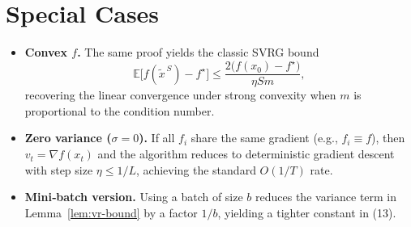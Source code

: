 \documentclass{article}
\newcommand{\EE}{\mathbb{E}}
\newcommand{\grad}{\nabla}
\begin{document}
\section*{Special Cases}
\begin{itemize}
\item \textbf{Convex $f$.} The same proof yields the classic SVRG bound
\[
\EE\!\bigl[f(\tilde{x}^{\,S})-f^\star\bigr]\le \frac{2\bigl(f(x_0)-f^\star\bigr)}{\eta S m},
\]
recovering the linear convergence under strong convexity when $m$ is proportional to the condition number.
\item \textbf{Zero variance ($\sigma=0$).} If all $f_i$ share the same gradient (e.g., $f_i\equiv f$), then $v_t=\grad f(x_t)$ and the algorithm reduces to deterministic gradient descent with step size $\eta\le 1/L$, achieving the standard $O(1/T)$ rate.
\item \textbf{Mini‑batch version.} Using a batch of size $b$ reduces the variance term in Lemma~\ref{lem:vr-bound} by a factor $1/b$, yielding a tighter constant in (13).
\end{itemize}
\end{document}
